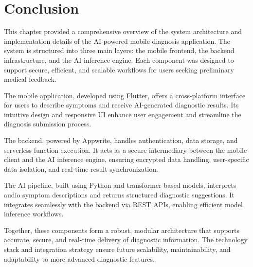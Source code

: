 \newpage


\section*{Conclusion}

\label{sec:system_summary}

This chapter provided a comprehensive overview of the system architecture and implementation details of the AI-powered mobile diagnosis application. The system is structured into three main layers: the mobile frontend, the backend infrastructure, and the AI inference engine. Each component was designed to support secure, efficient, and scalable workflows for users seeking preliminary medical feedback.

The mobile application, developed using Flutter, offers a cross-platform interface for users to describe symptoms and receive AI-generated diagnostic results. Its intuitive design and responsive UI enhance user engagement and streamline the diagnosis submission process.

The backend, powered by Appwrite, handles authentication, data storage, and serverless function execution. It acts as a secure intermediary between the mobile client and the AI inference engine, ensuring encrypted data handling, user-specific data isolation, and real-time result synchronization.

The AI pipeline, built using Python and transformer-based models, interprets audio symptom descriptions and returns structured diagnostic suggestions. It integrates seamlessly with the backend via REST APIs, enabling efficient model inference workflows.

Together, these components form a robust, modular architecture that supports accurate, secure, and real-time delivery of diagnostic information. The technology stack and integration strategy ensure future scalability, maintainability, and adaptability to more advanced diagnostic features.
